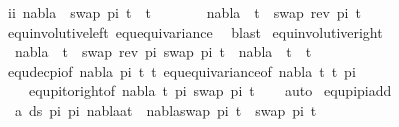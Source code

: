 \begin{isabellebody}
\isamarkupfalse%
\ ii{\isacharcolon}{\kern0pt}\ {\isachardoublequoteopen}nabla\ {\isasymturnstile}\ swap\ pi\ t{}\ {\isasymapprox}\ t{}{\isachardoublequoteclose}\isanewline
\ \ \ \ \isamarkupfalse%
\ \isamarkupfalse%
\ {\isachardoublequoteopen}nabla\ {\isasymturnstile}\ t{}\ {\isasymapprox}\ swap\ {\isacharparenleft}{\kern0pt}rev\ pi{\isacharparenright}{\kern0pt}\ t{}{\isachardoublequoteclose}\isanewline
\ \ \ \ \ \ \isamarkupfalse%
\ equ{\isacharunderscore}{\kern0pt}involutive{\isacharunderscore}{\kern0pt}left\ equ{\isacharunderscore}{\kern0pt}equivariance\ \isamarkupfalse%
\ blast\isacommand{{\isacharbraceright}{\kern0pt}}\isamarkupfalse%
\isanewline
{}\isamarkupfalse%
%
\endisatagproof
{\isafoldproof}%
%
\isadelimproof
\isanewline
%
\endisadelimproof
\isanewline
\isanewline
{}\isamarkupfalse%
\ equ{\isacharunderscore}{\kern0pt}involutive{\isacharunderscore}{\kern0pt}right{\isacharcolon}{\kern0pt}\ \isanewline
\ \ {\isachardoublequoteopen}nabla\ {\isasymturnstile}\ t{}\ {\isasymapprox}\ swap\ {\isacharparenleft}{\kern0pt}rev\ pi{\isacharparenright}{\kern0pt}\ {\isacharparenleft}{\kern0pt}swap\ pi\ t{}{\isacharparenright}{\kern0pt}\ {\isacharequal}{\kern0pt}\ nabla\ {\isasymturnstile}\ t{}\ {\isasymapprox}\ t{}{\isachardoublequoteclose}\isanewline
%
\isadelimproof
\ \ %
\endisadelimproof
%
\isatagproof
{}\isamarkupfalse%
\ equ{\isacharunderscore}{\kern0pt}dec{\isacharunderscore}{\kern0pt}pi{\isacharbrackleft}{\kern0pt}of\ nabla\ pi\ t{}\ t{}{\isacharbrackright}{\kern0pt}\ equ{\isacharunderscore}{\kern0pt}equivariance{\isacharbrackleft}{\kern0pt}of\ nabla\ t{}\ t{}\ pi{\isacharbrackright}{\kern0pt}\ \isanewline
\ \ \ \ equ{\isacharunderscore}{\kern0pt}pi{\isacharunderscore}{\kern0pt}to{\isacharunderscore}{\kern0pt}right{\isacharbrackleft}{\kern0pt}of\ nabla\ t{}\ pi\ {\isacartoucheopen}swap\ pi\ t{}{\isacartoucheclose}{\isacharbrackright}{\kern0pt}\isanewline
\ \ \isamarkupfalse%
\ auto%
\endisatagproof
{\isafoldproof}%
%
\isadelimproof
\isanewline
%
\endisadelimproof
\isanewline
{}\isamarkupfalse%
\ equ{\isacharunderscore}{\kern0pt}pi{}{\isacharunderscore}{\kern0pt}pi{}{\isacharunderscore}{\kern0pt}add{\isacharcolon}{\kern0pt}\ \isanewline
\ \ {\isachardoublequoteopen}{\isacharparenleft}{\kern0pt}{\isasymforall}a{\isasymin}\ ds\ pi{}\ pi{}{\isachardot}{\kern0pt}\ nabla{\isasymturnstile}a{\isasymsharp}t{\isacharparenright}{\kern0pt}\ {\isasymLongrightarrow}\ {\isacharparenleft}{\kern0pt}nabla{\isasymturnstile}swap\ pi{}\ t\ {\isasymapprox}\ swap\ pi{}\ t{\isacharparenright}{\kern0pt}{\isachardoublequoteclose}\isanewline

\end{isabellebody}
